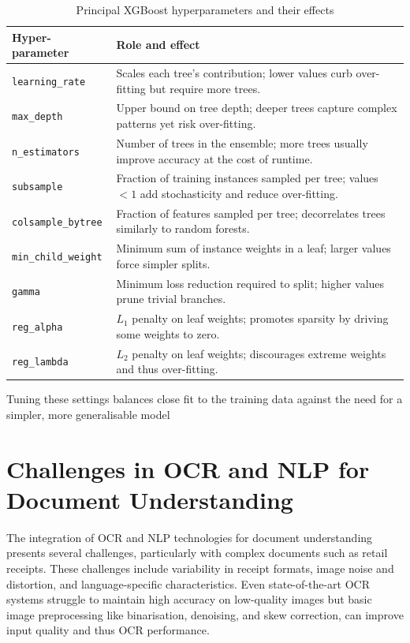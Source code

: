\documentclass{SGGW-thesis-EN}
\begin{document}
\begin{table}[h!]
  \centering
  \caption{Principal XGBoost hyperparameters and their effects}\label{tab:xgboost_hyperparameters}
  \begin{tabularx}{\textwidth}{@{}lX@{}}
    \toprule
    \textbf{Hyper-parameter} & \textbf{Role and effect} \\ 
    \midrule
    \texttt{learning\_rate}    & Scales each tree’s contribution; lower values curb over-fitting but require more trees. \\ 
    \texttt{max\_depth}        & Upper bound on tree depth; deeper trees capture complex patterns yet risk over-fitting. \\ 
    \texttt{n\_estimators}     & Number of trees in the ensemble; more trees usually improve accuracy at the cost of runtime. \\ 
    \texttt{subsample}         & Fraction of training instances sampled per tree; values $<1$ add stochasticity and reduce over-fitting. \\ 
    \texttt{colsample\_bytree} & Fraction of features sampled per tree; decorrelates trees similarly to random forests. \\ 
    \texttt{min\_child\_weight} & Minimum sum of instance weights in a leaf; larger values force simpler splits. \\ 
    \texttt{gamma}             & Minimum loss reduction required to split; higher values prune trivial branches. \\ 
    \texttt{reg\_alpha}        & $L_{1}$ penalty on leaf weights; promotes sparsity by driving some weights to zero. \\ 
    \texttt{reg\_lambda}       & $L_{2}$ penalty on leaf weights; discourages extreme weights and thus over-fitting. \\ 
    \bottomrule
  \end{tabularx}
\end{table}
Tuning these settings balances close fit to the training data against the need for a simpler,
more generalisable model

\section{Challenges in OCR and NLP for Document Understanding}

The integration of OCR and NLP technologies for document understanding presents several
challenges, particularly with complex documents such as retail receipts.
These challenges include variability in receipt formats, image noise and distortion, and
language-specific characteristics.
Even state-of-the-art OCR systems struggle to maintain high accuracy on low-quality images but
basic image preprocessing like binarisation, denoising, and skew correction, can improve
input quality and thus OCR performance.
\end{document}
